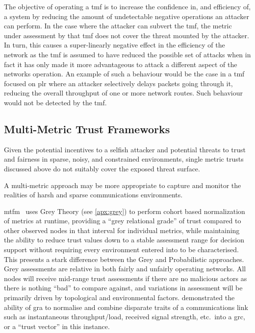 The objective of operating a \gls{tmf} is to increase the confidence in, and efficiency of, a system by reducing the amount of undetectable negative operations an attacker can perform.
In the case where the attacker can subvert the \gls{tmf}, the metric under assessment by that \gls{tmf} does not cover the threat mounted by the attacker.
In turn, this causes a super-linearly negative effect in the efficiency of the network as the \gls{tmf} is assumed to have reduced the possible set of attacks when in fact it has only made it more advantageous to attack a different aspect of the networks operation.
An example of such a behaviour would be the case in a \gls{tmf} focused on \gls{plr} where an attacker selectively delays packets going through it, reducing the overall throughput of one or more network routes.
Such behaviour would not be detected by the \gls{tmf}.

\subsection{Multi-Metric Trust Frameworks}\label{sec:multimetrictrust}
Given the potential incentives to a selfish attacker and potential threats to trust and fairness in sparse, noisy, and constrained environments, single metric trusts discussed above do not suitably cover the exposed threat surface.


A multi-metric approach may be more appropriate to capture and monitor the realities of harsh and sparse communications environments.

\gls{mtfm}~\cite{Guo11} uses Grey Theory (see \autoref{apx:grey}) to perform cohort based normalization of metrics at runtime, providing a ``grey relational grade'' of trust compared to other observed nodes in that interval for individual metrics, while maintaining the ability to reduce trust values down to a stable assessment range for decision support without requiring every environment entered into to be characterised.
This presents a stark difference between the Grey and Probabilistic approaches.
Grey assessments are relative in both fairly and unfairly operating networks.
All nodes will receive mid-range trust assessments if there are no malicious actors as there is nothing ``bad'' to compare against, and variations in assessment will be primarily driven by topological and environmental factors.
\citet{Guo11} demonstrated the ability of \gls{gra} to normalise and combine disparate traits of a communications link such as instantaneous throughput/load, received signal strength, etc.\ into a \gls{grc}, or a ``trust vector'' in this instance.

